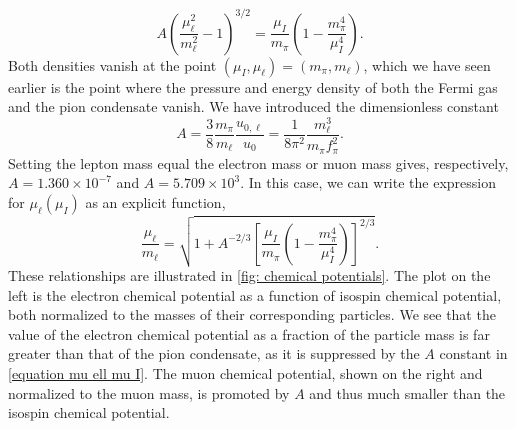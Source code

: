 %
\begin{equation}
    \label{equation mu ell mu I}
    A \left(\frac{\mu_\ell^2 }{m_\ell^2} - 1 \right)^{3/2}
    = \frac{\mu_I}{m_\pi}\left( 1 - \frac{m_\pi^4}{\mu_I^4}  \right).
\end{equation}
%
Both densities vanish at the point $(\mu_I, \mu_\ell) = (m_\pi, m_\ell)$, which we have seen earlier is the point where the pressure and energy density of both the Fermi gas and the pion condensate vanish.
We have introduced the dimensionless constant
%
\begin{equation}
    A = \frac{3}{8} \frac{m_\pi} {m_\ell} \frac{u_{0, \ell}}{u_0}
    = \frac{1}{8 \pi^2} \frac{m_\ell^3}{m_\pi f_\pi^2}.
\end{equation}
%
Setting the lepton mass equal the electron mass or muon mass gives, respectively, $A = 1.360 \times10^{- 7}$ and $A = 5.709 \times 10^{3}$.
In this case, we can write the expression for $\mu_\ell(\mu_I)$ as an explicit function,
%
\begin{equation}
    \label{mu ell from mu I}
    \frac{\mu_\ell}{m_\ell}
    =
    \sqrt{
        1 + A^{-2/3}
        \left[
            \frac{\mu_I}{m_\pi}\left( 1 - \frac{m_\pi^4}{\mu_I^4}  \right)
        \right]^{2/3}
    }.
\end{equation}
%
These relationships are illustrated in \autoref{fig: chemical potentials}.
The plot on the left is the electron chemical potential as a function of isospin chemical potential, both normalized to the masses of their corresponding particles.
We see that the value of the electron chemical potential as a fraction of the particle mass is far greater than that of the pion condensate, as it is suppressed by the $A$ constant in \autoref{equation mu ell mu I}.
The muon chemical potential, shown on the right and normalized to the muon mass, is promoted by $A$ and thus much smaller than the isospin chemical potential.

